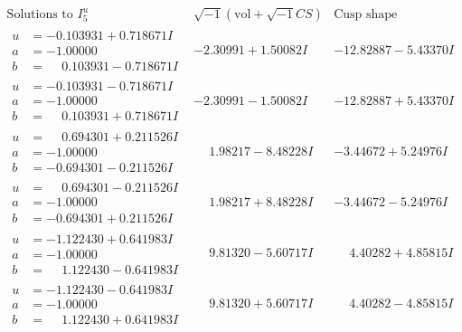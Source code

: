 \documentclass[1p]{elsarticle_modified}
\theoremstyle{definition}
\newcommand{\I}{\sqrt{-1}}
\begin{document}
$$\begin{array}{c|c|c}  
\text{Solutions to }I^u_{5}& \I (\text{vol} + \sqrt{-1}CS) & \text{Cusp shape}\\
 \hline 
\begin{aligned}
u &= -0.103931 + 0.718671 I \\
a &= -1.00000\phantom{ +0.000000I} \\
b &= \phantom{-}0.103931 - 0.718671 I\end{aligned}
 & -2.30991 + 1.50082 I & -12.82887 - 5.43370 I \\ \hline\begin{aligned}
u &= -0.103931 - 0.718671 I \\
a &= -1.00000\phantom{ +0.000000I} \\
b &= \phantom{-}0.103931 + 0.718671 I\end{aligned}
 & -2.30991 - 1.50082 I & -12.82887 + 5.43370 I \\ \hline\begin{aligned}
u &= \phantom{-}0.694301 + 0.211526 I \\
a &= -1.00000\phantom{ +0.000000I} \\
b &= -0.694301 - 0.211526 I\end{aligned}
 & \phantom{-}1.98217 - 8.48228 I & -3.44672 + 5.24976 I \\ \hline\begin{aligned}
u &= \phantom{-}0.694301 - 0.211526 I \\
a &= -1.00000\phantom{ +0.000000I} \\
b &= -0.694301 + 0.211526 I\end{aligned}
 & \phantom{-}1.98217 + 8.48228 I & -3.44672 - 5.24976 I \\ \hline\begin{aligned}
u &= -1.122430 + 0.641983 I \\
a &= -1.00000\phantom{ +0.000000I} \\
b &= \phantom{-}1.122430 - 0.641983 I\end{aligned}
 & \phantom{-}9.81320 - 5.60717 I & \phantom{-}4.40282 + 4.85815 I \\ \hline\begin{aligned}
u &= -1.122430 - 0.641983 I \\
a &= -1.00000\phantom{ +0.000000I} \\
b &= \phantom{-}1.122430 + 0.641983 I\end{aligned}
 & \phantom{-}9.81320 + 5.60717 I & \phantom{-}4.40282 - 4.85815 I \\ \hline\begin{aligned}

\end{aligned}
\end{array}$$
\end{document}

